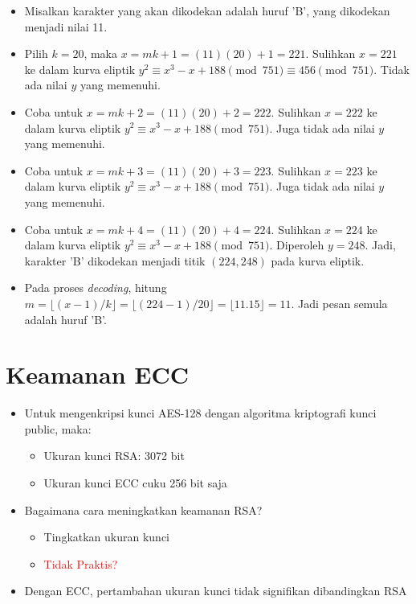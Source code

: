 \documentclass{article}
\begin{document}
\begin{itemize}
    \item Misalkan karakter yang akan dikodekan adalah huruf 'B', yang dikodekan menjadi nilai 11.
    \item Pilih $k = 20$, maka $x = mk + 1 = (11)(20) + 1 = 221$. Sulihkan $x = 221$ ke dalam kurva eliptik $y^2 \equiv x^3 - x + 188 \pmod{751} \equiv 456 \pmod{751}$. Tidak ada nilai $y$ yang memenuhi.
    \item Coba untuk $x = mk + 2 = (11)(20) + 2 = 222$. Sulihkan $x = 222$ ke dalam kurva eliptik $y^2 \equiv x^3 - x + 188 \pmod{751}$. Juga tidak ada nilai $y$ yang memenuhi.
    \item Coba untuk $x = mk + 3 = (11)(20) + 3 = 223$. Sulihkan $x = 223$ ke dalam kurva eliptik $y^2 \equiv x^3 - x + 188 \pmod{751}$. Juga tidak ada nilai $y$ yang memenuhi.
    \item Coba untuk $x = mk + 4 = (11)(20) + 4 = 224$. Sulihkan $x = 224$ ke dalam kurva eliptik $y^2 \equiv x^3 - x + 188 \pmod{751}$. Diperoleh $y = 248$. Jadi, karakter 'B' dikodekan menjadi titik $(224, 248)$ pada kurva eliptik.
    \item Pada proses \textit{decoding}, hitung $m = \lfloor (x - 1)/k \rfloor = \lfloor (224 - 1)/20 \rfloor = \lfloor 11.15 \rfloor = 11$. Jadi pesan semula adalah huruf 'B'.
\end{itemize}

\newpage


\section*{Keamanan ECC}

\vspace{133.65mm}

\begin{itemize}
    \item Untuk mengenkripsi kunci AES-128 dengan algoritma kriptografi kunci public, maka:
    \begin{itemize}
        \item Ukuran kunci RSA: 3072 bit
        \item Ukuran kunci ECC cuku 256 bit saja
    \end{itemize}
    \vspace{10mm}
    \item Bagaimana cara meningkatkan keamanan RSA?
    \begin{itemize}
        \item Tingkatkan ukuran kunci
        \item \textcolor{red}{Tidak Praktis?}
    \end{itemize}
    \item Dengan ECC, pertambahan ukuran kunci tidak signifikan dibandingkan RSA
\end{itemize}
\end{document}
